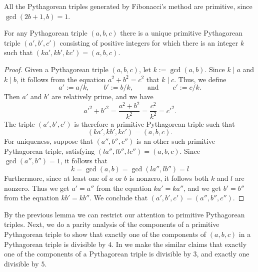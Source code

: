 \begin{example}
  All the Pythagorean triples generated by Fibonacci's method are primitive, since $\gcd(2b+1,b)=1$.
\end{example}

\begin{lemma}
  For any Pythagorean triple $(a,b,c)$ there is a unique primitive Pythagorean triple $(a',b',c')$ consisting of positive integers for which there is an integer $k$ such that $(ka',kb',kc')=(a,b,c)$.
\end{lemma}

\begin{proof}
  Given a Pythagorean triple $(a,b,c)$, let $k:=\gcd(a,b)$. Since $k\mid a$ and $k\mid b$, it follows from the equation $a^2+b^2=c^2$ that $k\mid c$. Thus, we define
  \begin{equation*}
    a' := a/k, \qquad b' := b/k, \qquad\text{and}\qquad c' := c/k.
  \end{equation*}
  Then $a'$ and $b'$ are relatively prime, and we have
  \begin{equation*}
    a'^2 + b'^2 = \frac{a^2+b^2}{k^2} = \frac{c^2}{k^2} = c'^2.
  \end{equation*}
  The triple $(a',b',c')$ is therefore a primitive Pythagorean triple such that
  \begin{equation*}
    (ka',kb',kc') = (a,b,c).
  \end{equation*}
  For uniqueness, suppose that $(a'',b'',c'')$ is an other such primitive Pythagorean triple, satisfying $(la'',lb'',lc'')=(a,b,c)$. Since $\gcd(a'',b'')=1$, it follows that
  \begin{equation*}
    k=\gcd(a,b)=\gcd(la'',lb'')=l
  \end{equation*}
  Furthermore, since at least one of $a$ or $b$ is nonzero, it follows both $k$ and $l$ are nonzero. Thus we get $a'=a''$ from the equation $ka'=ka''$, and we get $b'=b''$ from the equation $kb'=kb''$. We conclude that $(a',b',c')=(a'',b'',c'')$.
\end{proof}

By the previous lemma we can restrict our attention to primitive Pythagorean triples. Next, we do a parity analysis of the components of a primitive Pythagorean triple to show that exactly one of the components of $(a,b,c)$ in a Pythagorean triple is divisible by $4$. In  we make the similar claims that exactly one of the components of a Pythagorean triple is divisible by $3$, and exactly one divisible by $5$.

